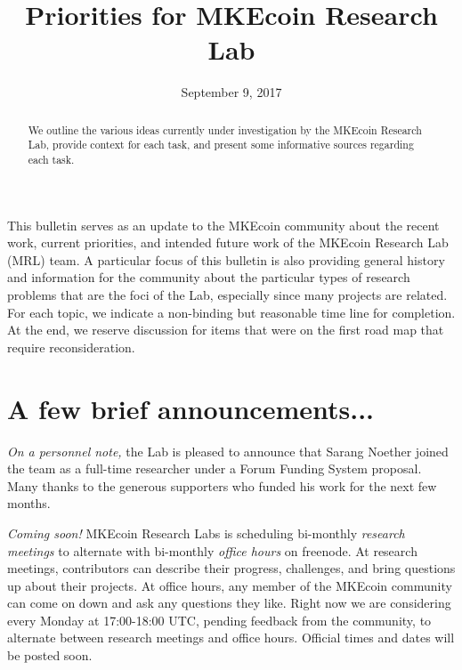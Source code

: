 \documentclass[12pt,english]{mrl}
\theoremstyle{definition}
\numberwithin{equation}{section}
\numberwithin{figure}{section}
\numberwithin{equation}{section}
\numberwithin{equation}{section}
\numberwithin{figure}{section}
\begin{document}
\begin{frontmatter}

\begin{fmbox}
\hfill\setlength{\fboxrule}{0px}\setlength{\fboxsep}{5px}
\title{Priorities for MKEcoin Research Lab}
\date{September 9, 2017}
\author[
   addressref={mrl},
   email={bggoode@g.clemson.edu}
]{ }
\author[
   addressref={mrl},
   email={sarang.noether@protonmail.com}
]{ }


\address[id=mrl]{
}
\end{fmbox}

\begin{abstractbox}
\begin{abstract}
We outline the various ideas currently under investigation by the MKEcoin Research Lab, provide context for each task, and present some informative sources regarding each task. \end{abstract}
\end{abstractbox}
\end{frontmatter}


This bulletin serves as an update to the MKEcoin community about the recent work, current priorities, and intended future work of the MKEcoin Research Lab (MRL) team. A particular focus of this bulletin is also providing general history and information for the community about the particular types of research problems that are the foci of the Lab, especially since many projects are related. For each topic, we indicate a non-binding but reasonable time line for completion. At the end, we reserve discussion for items that were on the first road map that require reconsideration.

\section{A few brief announcements...}

\textit{On a personnel note,} the Lab is pleased to announce that Sarang Noether joined the team as a full-time researcher under a Forum Funding System proposal. Many thanks to the generous supporters who funded his work for the next few months.

\textit{Coming soon!} MKEcoin Research Labs is scheduling bi-monthly \textit{research meetings} to alternate with bi-monthly \textit{office hours} on freenode. At research meetings, contributors can describe their progress, challenges, and bring questions up about their projects. At office hours, any member of the MKEcoin community can come on down and ask any questions they like. Right now we are considering every Monday at 17:00-18:00 UTC, pending feedback from the community, to alternate between research meetings and office hours. Official times and dates will be posted soon.
\end{document}
